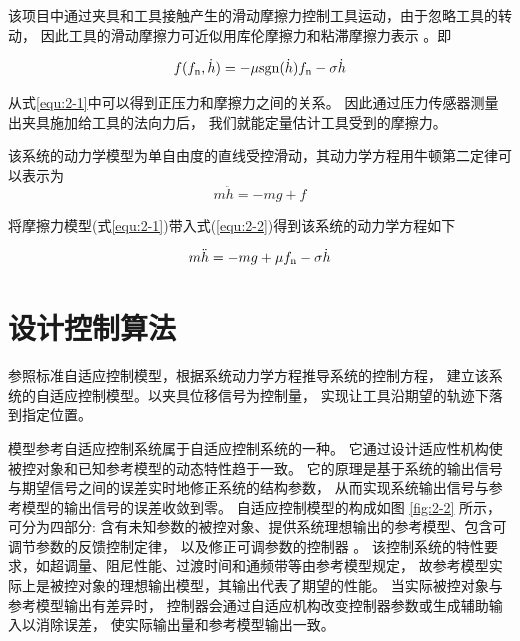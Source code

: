 该项目中通过夹具和工具接触产生的滑动摩擦力控制工具运动，由于忽略工具的转动，
因此工具的滑动摩擦力可近似用库伦摩擦力和粘滞摩擦力表示 \cite{ref9}。即

\begin{equation}
  f({f_{\rm n}},\dot h) =  - \mu {\mathop{\rm sgn}} (\dot h){f_{\rm n}} - \sigma \dot h
  \label{equ:2-1}
\end{equation}

\begin{note}
\end{note}

从式\ref{equ:2-1}中可以得到正压力和摩擦力之间的关系。
因此通过压力传感器测量出夹具施加给工具的法向力后，
我们就能定量估计工具受到的摩擦力。

该系统的动力学模型为单自由度的直线受控滑动，其动力学方程用牛顿第二定律可以表示为
\begin{equation}
  m\ddot h =  - mg + f
  \label{equ:2-2}
\end{equation}

\begin{note}
\end{note}

将摩擦力模型(式\ref{equ:2-1})带入式(\ref{equ:2-2})得到该系统的动力学方程如下

\begin{equation}
  m\ddot h =  - mg + \mu {f_{\rm n}} - \sigma \dot h
  \label{equ:2-3}
\end{equation}


\section{设计控制算法}
参照标准自适应控制模型，根据系统动力学方程推导系统的控制方程，
建立该系统的自适应控制模型。以夹具位移信号为控制量，
实现让工具沿期望的轨迹下落到指定位置。

模型参考自适应控制系统属于自适应控制系统的一种。
它通过设计适应性机构使被控对象和已知参考模型的动态特性趋于一致。
它的原理是基于系统的输出信号与期望信号之间的误差实时地修正系统的结构参数，
从而实现系统输出信号与参考模型的输出信号的误差收敛到零。
自适应控制模型的构成如图 \ref{fig:2-2} 所示，可分为四部分:
含有未知参数的被控对象、提供系统理想输出的参考模型、包含可调节参数的反馈控制定律，
以及修正可调参数的控制器 \cite{ref10} 。
该控制系统的特性要求，如超调量、阻尼性能、过渡时间和通频带等由参考模型规定，
故参考模型实际上是被控对象的理想输出模型，其输出代表了期望的性能。
当实际被控对象与参考模型输出有差异时，
控制器会通过自适应机构改变控制器参数或生成辅助输入以消除误差，
使实际输出量和参考模型输出一致。

